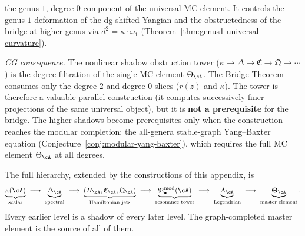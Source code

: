 \begin{remark}
\begin{enumerate}[label=\textup{(\roman*)}]
 the genus-$1$, degree-$0$ component of the universal MC element.
 It controls the genus-$1$ deformation of the dg-shifted Yangian
 and the obstructedness of the bridge at higher genus via
 $d^2 = \kappa \cdot \omega_1$
 (Theorem~\ref{thm:genus1-universal-curvature}).
\end{enumerate}
\emph{CG consequence.}
The nonlinear shadow obstruction tower ($\kappa \to \Delta \to \mathfrak{C}
\to \mathfrak{Q} \to \cdots$) is the degree filtration of the
single MC element $\Theta_\cA$. The Bridge Theorem consumes only
the degree-$2$ and degree-$0$ slices ($r(z)$ and $\kappa$).
The tower is therefore a valuable parallel construction (it
computes successively finer projections of the same universal
object), but it is \textbf{not a prerequisite} for the bridge.
The higher shadows become prerequisites only when the construction
reaches the modular completion: the all-genera stable-graph
Yang--Baxter equation
(Conjecture~\ref{conj:modular-yang-baxter}), which requires
the full MC element $\Theta_\cA$ at all degrees.
\end{remark}

\begin{remark}
\label{rem:nms-extended-hierarchy}
The full hierarchy, extended by the constructions of this appendix, is
\[
\underbrace{\kappa(\cA)}_{\text{scalar}}
\;\longrightarrow\;
\underbrace{\Delta_{\cA}}_{\text{spectral}}
\;\longrightarrow\;
\underbrace{(H_{\cA},\mathfrak C_{\cA},\mathfrak Q_{\cA})}_{\text{Hamiltonian jets}}
\;\longrightarrow\;
\underbrace{\mathfrak R^{\mathrm{mod}}_\bullet(\cA)}_{\text{resonance tower}}
\;\longrightarrow\;
\underbrace{\Lambda_{\cA}}_{\text{Legendrian}}
\;\longrightarrow\;
\underbrace{\boldsymbol\Theta_{\cA}}_{\text{master element}}.
\]
Every earlier level is a shadow of every later level. The graph-completed master element is the source of all of them.
\end{remark}

